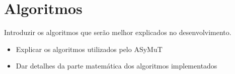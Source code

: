 \section{Algoritmos}
\label{sec:algoritmos}

Introduzir os algoritmos que serão melhor explicados no desenvolvimento.
\begin{itemize}
\item Explicar os algoritmos utilizados pelo ASyMuT
\item Dar detalhes da parte matemática dos algoritmos implementados
\end{itemize}
